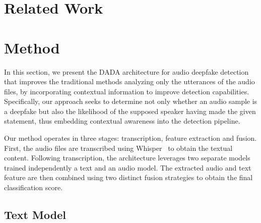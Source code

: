 \documentclass{Interspeech}
\begin{document}
\section{Related Work}\label{sec:related_work}

\section{Method}\label{sec:method}

In this section, we present the DADA architecture for audio deepfake detection
that improves the traditional methods analyzing only the utterances of the
audio files, by incorporating contextual information to improve detection
capabilities. Specifically, our approach seeks to determine not only whether an
audio sample is a deepfake but also the likelihood of the supposed speaker
having made the given statement, thus embedding contextual awareness into the
detection pipeline.

Our method operates in three stages: transcription, feature extraction and
fusion. First, the audio files are transcribed using
Whisper~\cite{radford2023robust} to obtain the textual content. Following
transcription, the architecture leverages two separate models trained
independently a text and an audio model. The extracted audio and text feature
are then combined using two distinct fusion strategies to obtain the final
classification score.
\subsection{Text Model}
\end{document}
